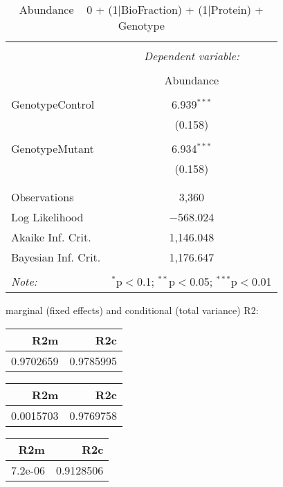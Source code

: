 \documentclass[11pt]{report}
\begin{document}
\begin{table}[!htbp] \centering 
  \caption{Abundance ~ 0 + (1|BioFraction) + (1|Protein) + Genotype} 
  \label{} 
\begin{tabular}{@{\extracolsep{5pt}}lc} 
\\[-1.8ex]\hline 
\hline \\[-1.8ex] 
 & \multicolumn{1}{c}{\textit{Dependent variable:}} \\ 
\cline{2-2} 
\\[-1.8ex] & Abundance \\ 
\hline \\[-1.8ex] 
 GenotypeControl & 6.939$^{***}$ \\ 
  & (0.158) \\ 
  & \\ 
 GenotypeMutant & 6.934$^{***}$ \\ 
  & (0.158) \\ 
  & \\ 
\hline \\[-1.8ex] 
Observations & 3,360 \\ 
Log Likelihood & $-$568.024 \\ 
Akaike Inf. Crit. & 1,146.048 \\ 
Bayesian Inf. Crit. & 1,176.647 \\ 
\hline 
\hline \\[-1.8ex] 
\textit{Note:}  & \multicolumn{1}{r}{$^{*}$p$<$0.1; $^{**}$p$<$0.05; $^{***}$p$<$0.01} \\ 
\end{tabular} 
\end{table} 
marginal (fixed effects) and conditional (total variance) R2:

\begin{tabular}{r|r}
\hline
R2m & R2c\\
\hline
0.9702659 & 0.9785995\\
\hline
\end{tabular}

\begin{tabular}{r|r}
\hline
R2m & R2c\\
\hline
0.0015703 & 0.9769758\\
\hline
\end{tabular}

\begin{tabular}{r|r}
\hline
R2m & R2c\\
\hline
7.2e-06 & 0.9128506\\
\hline
\end{tabular}
\end{document}
